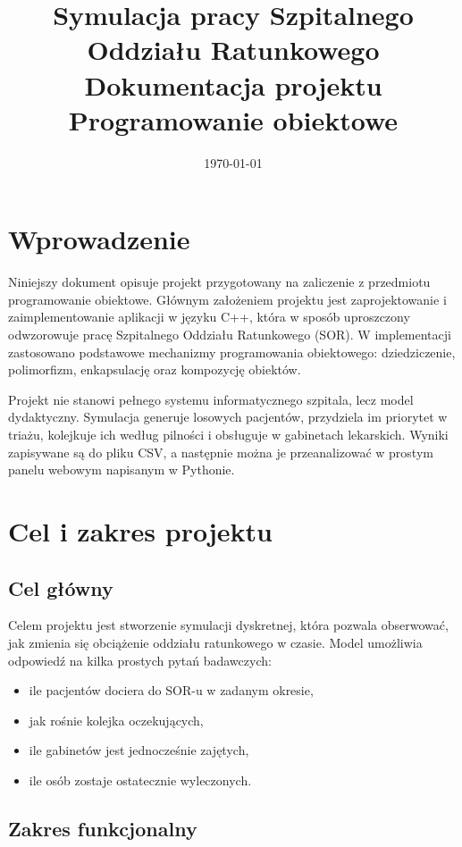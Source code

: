 \documentclass[12pt,a4paper]{article}
\title{%
    \textbf{Symulacja pracy Szpitalnego Oddziału Ratunkowego}\\[0.4em]
    \large Dokumentacja projektu\\Programowanie obiektowe
}
\date{\today}
\begin{document}
\maketitle
\tableofcontents
\newpage

\section{Wprowadzenie}

Niniejszy dokument opisuje projekt przygotowany na zaliczenie z przedmiotu
programowanie obiektowe. Głównym założeniem projektu jest zaprojektowanie
i zaimplementowanie aplikacji w języku C++, która w sposób uproszczony
odwzorowuje pracę Szpitalnego Oddziału Ratunkowego (SOR). W implementacji
zastosowano podstawowe mechanizmy programowania obiektowego: dziedziczenie,
polimorfizm, enkapsulację oraz kompozycję obiektów.

Projekt nie stanowi pełnego systemu informatycznego szpitala, lecz model
dydaktyczny. Symulacja generuje losowych pacjentów, przydziela im priorytet
w triażu, kolejkuje ich według pilności i obsługuje w gabinetach lekarskich.
Wyniki zapisywane są do pliku CSV, a następnie można je przeanalizować
w prostym panelu webowym napisanym w Pythonie.

\section{Cel i zakres projektu}

\subsection{Cel główny}

Celem projektu jest stworzenie symulacji dyskretnej, która pozwala obserwować,
jak zmienia się obciążenie oddziału ratunkowego w czasie. Model umożliwia
odpowiedź na kilka prostych pytań badawczych:
\begin{itemize}[noitemsep]
	\item ile pacjentów dociera do SOR-u w zadanym okresie,
	\item jak rośnie kolejka oczekujących,
	\item ile gabinetów jest jednocześnie zajętych,
	\item ile osób zostaje ostatecznie wyleczonych.
\end{itemize}

\subsection{Zakres funkcjonalny}
\end{document}
